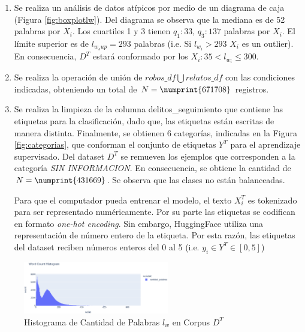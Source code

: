 \documentclass[onecolumn, journal, english, 12pt, a4paper]{IEEEtran} %
\theoremstyle{definition}
\begin{document}
\begin{enumerate}
    \item Se realiza un análisis de datos atípicos por medio de un diagrama de caja (Figura \ref{fig:boxplotlw}). Del diagrama se observa que la mediana es de 52 palabras por $X_i$. Los cuartiles 1 y 3 tienen $q_1:33$, $q_3:137$ palabras por $X_i$. El límite superior es de $l_{w_sup} = 293$ palabras (i.e. Si $l_{w_i} > 293$ $X_i$ es un outlier). En consecuencia, $D^T$ estará conformado por los $X_i:35< l_{w_i} \leq 300$. 
    \item Se realiza la operación de unión de $robos\_df \bigcup relatos\_df$ con las condiciones indicadas, obteniendo un total de $N = \numprint{671708}$ registros.
    \item Se realiza la limpieza de la columna delitos\_seguimiento que contiene las etiquetas para la clasificación, dado que, las etiquetas están escritas de manera distinta. Finalmente, se obtienen 6 categorías, indicadas en la Figura \ref{fig:categorias}, que conforman el conjunto de etiquetas $Y^T$ para el aprendizaje supervisado. Del dataset $D^T$ se remueven los ejemplos que corresponden a la categoría \emph{SIN INFORMACION}. En consecuencia, se obtiene la cantidad de $N = \numprint{431669}$. Se observa que las clases no están balanceadas. 
    
    Para que el computador pueda entrenar el modelo, el texto $X^T_i$ es tokenizado para ser representado numéricamente. Por su parte las etiquetas se codifican en formato \emph{one-hot encoding}. Sin embargo, HuggingFace utiliza una representación de número entero de la etiqueta. Por esta razón, las etiquetas del dataset reciben números enteros del 0 al 5 (i.e. $y_i \in Y^T \in [0,5]$)
\end{enumerate}


\begin{figure}[!t]
    \centering
    \includegraphics[width=2.5in]{imgs/histograma.eps}
    \caption{Histograma de Cantidad de Palabras $l_w$ en Corpus $D^T$}
    \label{fig:histogramalw}
\end{figure}
\end{document}
